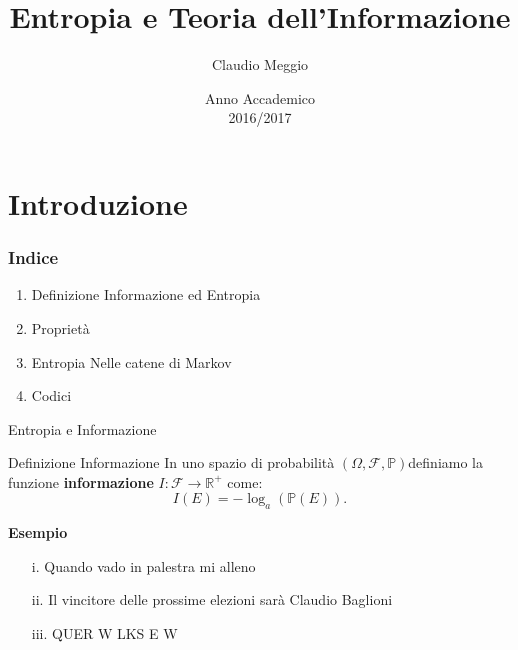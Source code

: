 \documentclass{beamer}
\theoremstyle{definition}
\numberwithin{equation}{section}
\newcommand{\spacep}{$(\Omega,\mathcal{F} ,\mathbb{P})$}
\begin{document}
\title{Entropia e Teoria dell'Informazione}
\author{Claudio Meggio}
\date{Anno Accademico\\2016/2017}
\begin{frame}
\titlepage 
\end{frame}
\section{Introduzione}
\begin{frame}
\frametitle{Indice}
\begin{enumerate}
\item Definizione Informazione ed Entropia
\item Proprietà
\item Entropia Nelle catene di Markov
\item Codici
\end{enumerate}
\end{frame}



\begin{frame}[t]{Entropia e Informazione} \vspace{5pt}
\begin{block}{Definizione Informazione}
\vspace{0.5em}
In uno spazio di probabilità \spacep definiamo la funzione \textbf{informazione} $I: \mathcal{F}\to \mathbb{R}^+$ come:
\begin{equation*}
I(E)=-\log_a(\mathbb{P} (E)).
\end{equation*}
\vspace{0.5em}
\end{block}
\large \textbf{Esempio}
\begin{enumerate}
\item[i.] Quando vado in palestra mi alleno
\item[ii.] Il vincitore delle prossime elezioni sarà Claudio Baglioni
\item[iii.] QUER W LKS E W
\end{enumerate}
\end{frame}
\end{document}
